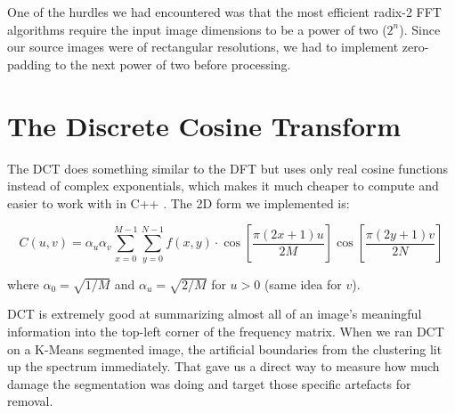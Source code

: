 \vspace{0.15in}
\noindent
One of the hurdles we had encountered was that the most efficient radix-2 FFT algorithms require the input image dimensions to be a power of two ($2^n$). Since our source images were of rectangular resolutions, we had to implement zero-padding to the next power of two before processing.


\section{The Discrete Cosine Transform}

The DCT does something similar to the DFT but uses only real cosine functions instead
of complex exponentials, which makes it much cheaper to compute and easier to work
with in C++ \cite{ahmed1974}. The 2D form we implemented is:

\begin{equation}
    C(u, v) = \alpha_u \alpha_v \sum_{x=0}^{M-1} \sum_{y=0}^{N-1}
    f(x, y) \cdot \cos\!\left[\frac{\pi(2x+1)u}{2M}\right]
    \cos\!\left[\frac{\pi(2y+1)v}{2N}\right]
\end{equation}

\noindent where $\alpha_0 = \sqrt{1/M}$ and $\alpha_u = \sqrt{2/M}$ for $u > 0$
(same idea for $v$).

\vspace{0.15in}
\noindent
DCT is extremely good at summarizing almost all of an
image's meaningful information into the top-left corner of the frequency matrix. When we ran
DCT on a K-Means segmented image, the artificial boundaries from the clustering lit up
the spectrum immediately. That gave us a direct way to measure how much damage the
segmentation was doing and target those specific artefacts for removal.
